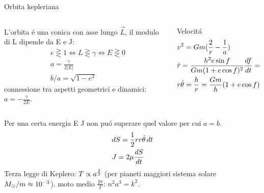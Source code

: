\begin{wordonframe}{Orbita kepleriana}
\begin{columns}[T]
\begin{column}{0.45\textwidth}
L'orbita \'e una conica con asse lungo $\vec{L}$, il modulo di L dipende da E e J:
\begin{align*}
&e\gtreqless1\Leftrightarrow L\gtreqless\gamma\Leftrightarrow E\gtreqless0\\
&a=\frac{\gamma}{2|E|}\\
&b/a=\sqrt{1-e^2}
\end{align*}
connessione tra aspetti geometrici e dinamici: $a=-\frac{\gamma}{2E}$.
\end{column}
\begin{column}{0.55\textwidth}
\begin{block}{Velocit\'a}
\begin{align*}
&v^2=Gm(\frac{2}{r}-\frac{1}{a})\\
&\dot{r}=\frac{h^2e\sin{f}}{Gm(1+e\cos{f})^2}\TDy{t}{f}=\frac{Gm}{h}e\sin{f}\\
&r\dot{\theta}=\frac{h}{r}=\frac{Gm}{h}(1+e\cos{f})
\end{align*}
\end{block}
\end{column}
\end{columns}
Per una certa energia E J non pu\'o superare quel valore per cui $a=b$.
\begin{align*}
&dS=\frac{1}{2}rr\dot{\theta}\,dt\\
&J=2\mu\TDy{t}{S}
\end{align*}
Terza legge di Keplero: $T\propto a\expy{\frac{3}{2}}$ (per pianeti maggiori sistema solare $\msun{}/m\approx\num{e-3}$).
moto medio $\frac{2\pi}{T}$: $n^2a^3=k^2$.
\end{wordonframe}

